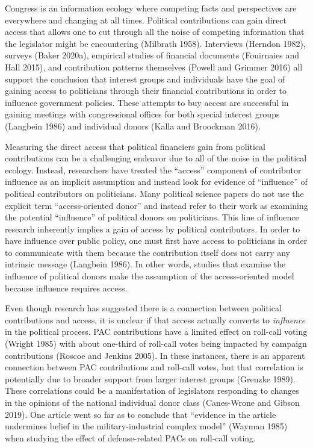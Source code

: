\documentclass[12pt,]{article}
\begin{document}
Congress is an information ecology where competing facts and
perspectives are everywhere and changing at all times. Political
contributions can gain direct access that allows one to cut through all
the noise of competing information that the legislator might be
encountering (Milbrath 1958). Interviews (Herndon 1982), surveys (Baker
2020a), empirical studies of financial documents (Fouirnaies and Hall
2015), and contribution patterns themselves (Powell and Grimmer 2016)
all support the conclusion that interest groups and individuals have the
goal of gaining access to politicians through their financial
contributions in order to influence government policies. These attempts
to buy access are successful in gaining meetings with congressional
offices for both special interest groups (Langbein 1986) and individual
donors (Kalla and Broockman 2016).

Measuring the direct access that political financiers gain from
political contributions can be a challenging endeavor due to all of the
noise in the political ecology. Instead, researchers have treated the
``access'' component of contributor influence as an implicit assumption
and instead look for evidence of ``influence'' of political contributors
on politicians. Many political science papers do not use the explicit
term ``access-oriented donor'' and instead refer to their work as
examining the potential ``influence'' of political donors on
politicians. This line of influence research inherently implies a gain
of access by political contributors. In order to have influence over
public policy, one must first have access to politicians in order to
communicate with them because the contribution itself does not carry any
intrinsic message (Langbein 1986). In other words, studies that examine
the influence of political donors make the assumption of the
access-oriented model because influence requires access.

Even though research has suggested there is a connection between
political contributions and access, it is unclear if that access
actually converts to \emph{influence} in the political process. PAC
contributions have a limited effect on roll-call voting (Wright 1985)
with about one-third of roll-call votes being impacted by campaign
contributions (Roscoe and Jenkins 2005). In these instances, there is an
apparent connection between PAC contributions and roll-call votes, but
that correlation is potentially due to broader support from larger
interest groups (Grenzke 1989). These correlations could be a
manifestation of legislators responding to changes in the opinions of
the national individual donor class (Canes-Wrone and Gibson 2019). One
article went so far as to conclude that ``evidence in the article
undermines belief in the military-industrial complex model'' (Wayman
1985) when studying the effect of defense-related PACs on roll-call
voting.
\end{document}
